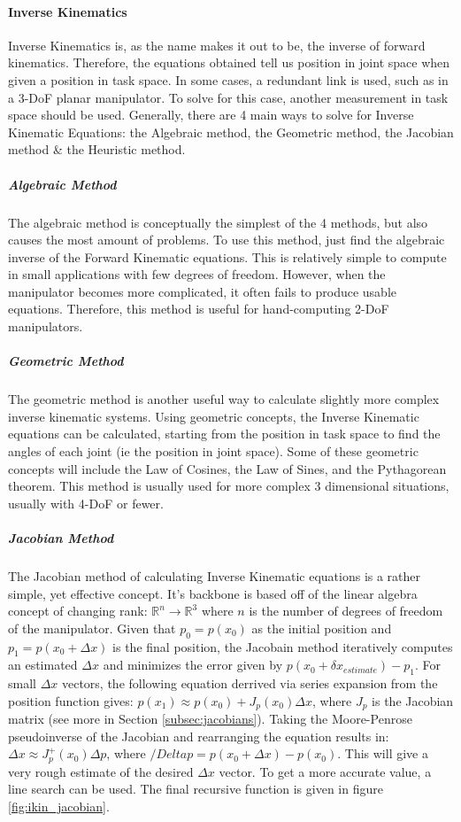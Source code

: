             \paragraph*{Inverse Kinematics}
            Inverse Kinematics is, as the name makes it out to be, the inverse of forward kinematics. Therefore, the equations obtained tell us position in joint space when given a position in task space. In some cases, a redundant link is used, such as in a 3-DoF planar manipulator. To solve for this case, another measurement in task space should be used. Generally, there are 4 main ways to solve for Inverse Kinematic Equations: the Algebraic method, the Geometric method, the Jacobian method \& the Heuristic method.
            \subparagraph*{Algebraic Method}
                The algebraic method is conceptually the simplest of the 4 methods, but also causes the most amount of problems. To use this method, just find the algebraic inverse of the Forward Kinematic equations. This is relatively simple to compute in small applications with few degrees of freedom. However, when the manipulator becomes more complicated, it often fails to produce usable equations. Therefore, this method is useful for hand-computing 2-DoF manipulators.
            \subparagraph*{Geometric Method}
                The geometric method is another useful way to calculate slightly more complex inverse kinematic systems. Using geometric concepts, the Inverse Kinematic equations can be calculated, starting from the position in task space to find the angles of each joint (ie the position in joint space). Some of these geometric concepts will include the Law of Cosines, the Law of Sines, and the Pythagorean theorem. This method is usually used for more complex 3 dimensional situations, usually with 4-DoF or fewer.
            \subparagraph*{Jacobian Method}
                The Jacobian method of calculating Inverse Kinematic equations is a rather simple, yet effective concept. It's backbone is based off of the linear algebra concept of changing rank: $\mathbb{R}^n \rightarrow \mathbb{R}^3$ where $n$ is the number of degrees of freedom of the manipulator. Given that $p_0 = p(x_0)$ as the initial position and $p_1 = p(x_0 + \Delta x)$ is the final position, the Jacobain method iteratively computes an estimated $\Delta x$ and minimizes the error given by $p(x_0 + \delta x_{estimate}) - p_1$. For small $\Delta x$ vectors, the following equation derrived via series expansion from the position function gives: $p(x_1) \approx p(x_0) + J_p (x_0)\Delta x$, where $J_p$ is the Jacobian matrix (see more in Section \ref{subsec:jacobians}). Taking the Moore-Penrose pseudoinverse \cite{wikipedia_pseudoinverse} of the Jacobian and rearranging the equation results in: $\Delta x \approx J_p^+(x_0)\Delta p$, where $/Delta p = p(x_0 + \Delta x) - p(x_0)$. This will give a very rough estimate of the desired $\Delta x$ vector. To get a more accurate value, a line search can be used. The final recursive function is given in figure \ref{fig:ikin_jacobian}. \cite{wikipedia_ikin}
